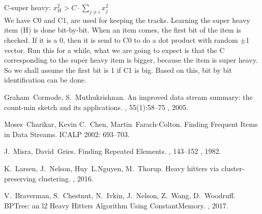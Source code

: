 \documentclass[11pt]{article}
\begin{document}
C-super heavy: $x_H^2 > C \cdot \sum\limits_{j \neq i}{x_j^2}$ \\

We have C0 and C1, are used for keeping the tracks.  Learning the super heavy item (H) is done bit-by-bit. When an item comes, the first bit of the item is checked.  If it is a 0, then it is send to C0 to do a dot product with random $\pm$1 vector. Run this for a while, what we are going to expect is that the C corresponding to the super heavy item is bigger, because the item is super heavy.  So we shall assume the first bit is 1 if C1 is big.  Based on this, bit by bit identification can be done.




\begin{thebibliography}{42}

Graham~Cormode, S.~Muthukrishnan.
\newblock An improved data stream summary: the count-min sketch and its applications.
, 55(1):58--75 , 2005.

Moses~Charikar, Kevin C.~Chen, Martin~Farach-Colton.
\newblock Finding Frequent Items in Data Streams.
\newblock ICALP 2002: 693--703.

J.~Misra, David~Gries.
\newblock Finding Repeated Elements.
, 143--152 , 1982.

K.~Larsen, J.~Nelson, Huy~L.Nguyen, M.~Thorup. 
\newblock Heavy hitters via cluster-preserving clustering.
, 2016.

V.~Braverman, S.~Chestnut, N.~Ivkin, J.~Nelson, Z.~Wang, D.~Woodruff. 
\newblock BPTree: an l2 Heavy Hitters Algorithm Using ConstantMemory.
, 2017.

\end{thebibliography}
\end{document}

